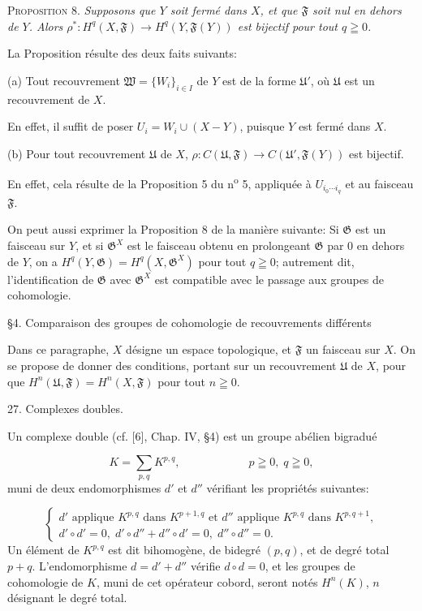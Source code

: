 \textsc{Proposition} 8. \textit{Supposons que $Y$ soit fermé dans $X$, et que $\mathfrak{F}$ soit nul en dehors de $Y$. Alors $\rho^*:H^q(X, \mathfrak{F}) \to H^q(Y, \mathfrak{F}(Y))$ est bijectif pour tout $q \geqq 0$.}

La Proposition résulte des deux faits suivants:

(a) Tout recouvrement $\mathfrak{W} = \{W_i\}_{i \in I}$ de $Y$ est de la forme $\mathfrak{U}'$, où $\mathfrak{U}$ est un recouvrement de $X$.

En effet, il suffit de poser $U_i = W_i \cup (X - Y)$, puisque $Y$ est fermé dans $X$.

(b) Pour tout recouvrement $\mathfrak{U}$ de $X$, $\rho:C(\mathfrak{U}, \mathfrak{F}) \to C(\mathfrak{U}', \mathfrak{F}(Y))$ est bijectif.

En effet, cela résulte de la Proposition 5 du n\textsuperscript{o} 5, appliquée à $U_{i_0 \cdots i_q}$ et au faisceau $\mathfrak{F}$.

On peut aussi exprimer la Proposition 8 de la manière suivante: Si $\mathfrak{G}$ est un faisceau sur $Y$, et si $\mathfrak{G}^X$ est le faisceau obtenu en prolongeant $\mathfrak{G}$ par 0 en dehors de $Y$, on a $H^q(Y, \mathfrak{G}) = H^q(X, \mathfrak{G}^X)$ pour tout $q \geqq 0$; autrement dit, l'identification de $\mathfrak{G}$ avec $\mathfrak{G}^X$ est compatible avec le passage aux groupes de cohomologie.


\S4. Comparaison des groupes de cohomologie de recouvrements différents

Dans ce paragraphe, $X$ désigne un espace topologique, et $\mathfrak{F}$ un faisceau sur $X$. On se propose de donner des conditions, portant sur un recouvrement $\mathfrak{U}$ de $X$, pour que $H^n(\mathfrak{U}, \mathfrak{F}) = H^n(X, \mathfrak{F})$ pour tout $n \geqq 0$.


27. Complexes doubles.

Un complexe double (cf. [6], Chap. IV, \S4) est un groupe abélien bigradué

\begin{equation*}
K = \sum_{p,q} K^{p,q}, \qquad\qquad\qquad p \geqq 0,\; q \geqq 0,
\end{equation*}
muni de deux endomorphismes $d'$ et $d''$ vérifiant les propriétés suivantes:

\begin{equation*}
\begin{cases} d' \text{ applique } K^{p,q} \text{ dans } K^{p+1,q} \text{ et } d'' \text{ applique } K^{p,q} \text{ dans } K^{p,q+1}, \\ d' \circ d' = 0,\; d' \circ d'' + d'' \circ d' = 0,\; d'' \circ d'' = 0. \end{cases}
\end{equation*}
Un élément de $K^{p,q}$ est dit bihomogène, de bidegré $(p, q)$, et de degré total $p + q$. L'endomorphisme $d = d' + d''$ vérifie $d \circ d = 0$, et les groupes de cohomologie de $K$, muni de cet opérateur cobord, seront notés $H^n(K)$, $n$ désignant le degré total.

